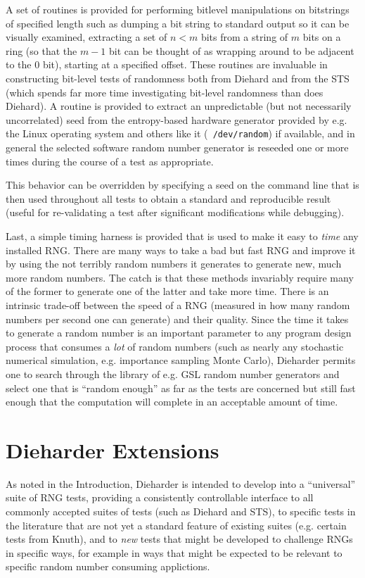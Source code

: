 \documentclass[12pt]{book}
\begin{document}
A set of routines is provided for performing bitlevel manipulations on
bitstrings of specified length such as dumping a bit string to standard
output so it can be visually examined, extracting a set of $n<m$ bits
from a string of $m$ bits on a ring (so that the $m-1$ bit can be
thought of as wrapping around to be adjacent to the $0$ bit), starting
at a specified offset.  These routines are invaluable in constructing
bit-level tests of randomness both from Diehard and from the STS (which
spends far more time investigating bit-level randomness than does
Diehard).  A routine is provided to extract an unpredictable (but not
necessarily uncorrelated) seed from the entropy-based hardware generator
provided by e.g. the Linux operating system and others like it ({\tt
/dev/random}) if available, and in general the selected software random
number generator is reseeded one or more times during the course of a
test as appropriate.  

This behavior can be overridden by specifying a seed on the command line
that is then used throughout all tests to obtain a standard and
reproducible result (useful for re-validating a test after significant
modifications while debugging).  

Last, a simple timing harness is provided that is used to make it easy
to {\em time} any installed RNG.  There are many ways to take a bad but
fast RNG and improve it by using the not terribly random numbers it
generates to generate new, much more random numbers.  The catch is that
these methods invariably require many of the former to generate one of
the latter and take more time.  There is an intrinsic trade-off between
the speed of a RNG (measured in how many random numbers per second one
can generate) and their quality.  Since the time it takes to generate a
random number is an important parameter to any program design process
that consumes a {\em lot} of random numbers (such as nearly any
stochastic numerical simulation, e.g. importance sampling Monte Carlo),
Dieharder permits one to search through the library of e.g. GSL random
number generators and select one that is ``random enough'' as far as
the tests are concerned but still fast enough that the computation will
complete in an acceptable amount of time.

\chapter{Dieharder Extensions}

As noted in the Introduction, Dieharder is intended to develop into a
``universal'' suite of RNG tests, providing a consistently controllable
interface to all commonly accepted suites of tests (such as Diehard and
STS), to specific tests in the literature that are not yet a standard
feature of existing suites (e.g. certain tests from Knuth), and to {\em
new} tests that might be developed to challenge RNGs in specific ways,
for example in ways that might be expected to be relevant to specific
random number consuming applictions.
\end{document}
